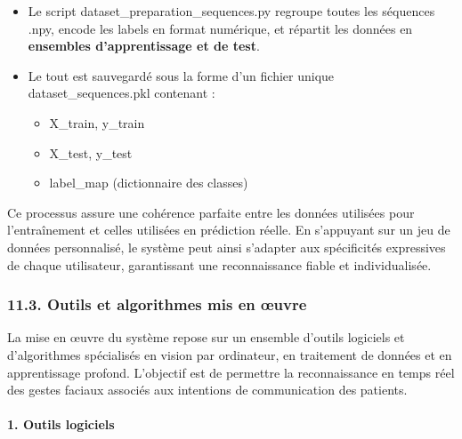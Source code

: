 \documentclass[
]{article}
\begin{document}
\begin{itemize}
\item
  Le script dataset\_preparation\_sequences.py regroupe toutes les séquences .npy, encode les labels en format numérique, et répartit les données en \textbf{ensembles d'apprentissage et de test}.
\item
  Le tout est sauvegardé sous la forme d'un fichier unique dataset\_sequences.pkl contenant :

  \begin{itemize}
  \item
    X\_train, y\_train
  \item
    X\_test, y\_test
  \item
    label\_map (dictionnaire des classes)
  \end{itemize}
\end{itemize}

Ce processus assure une cohérence parfaite entre les données utilisées pour l'entraînement et celles utilisées en prédiction réelle. En s'appuyant sur un jeu de données personnalisé, le système peut ainsi s'adapter aux spécificités expressives de chaque utilisateur, garantissant une reconnaissance fiable et individualisée.

\hypertarget{outils-et-algorithmes-mis-en-ux153uvre}{%
\subsubsection{11.3. Outils et algorithmes mis en œuvre}\label{outils-et-algorithmes-mis-en-ux153uvre}}

La mise en œuvre du système repose sur un ensemble d'outils logiciels et d'algorithmes spécialisés en vision par ordinateur, en traitement de données et en apprentissage profond. L'objectif est de permettre la reconnaissance en temps réel des gestes faciaux associés aux intentions de communication des patients.

\hypertarget{outils-logiciels}{%
\paragraph{\texorpdfstring{\textbf{1. Outils logiciels}}{1. Outils logiciels}}\label{outils-logiciels}}
\end{document}
